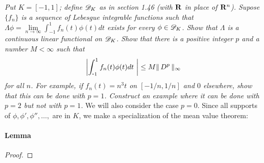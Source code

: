 \textit{
Put $K=[-1,1]$; define ${\mathscr D}_{K}$ as in section 1.46 
(with ${\mathbf R}$ in place of ${\mathbf R}^{n}$). 
Supose $\{f_{n}\}$ is a sequence of Lebesgue integrable functions such that 
%
  $\Lambda\phi 
    = 
  \underset{n \to \infty}{\lim} \int_{\minus 1}^1 f_{n}(t)\phi(t)dt$
%
exists for every $\phi\in{\mathscr D}_{K}$. 
Show that $\Lambda$ is a continuous linear functional on ${\mathscr D}_{K}$. 
Show that there is a positive integer $p$ and a number $M<\infty$ such that 
  \begin{align}
    \left\lvert 
      \int_{\text{\small{-}} 1}^1 f_n (t)\phi (t) dt\
    \right\rvert
    \leq 
    M \| \,D^{p} \, \|_{\infty} 
  \nonumber
  \end{align}
for all $n$.
For example, if $f_{n}(t)=n^{3}t$ on $[\minus 1/n, 1/n]$ and $0$ elsewhere, 
show that this can be done with $p=1$. 
Construct an example where it can be done with $p=2$ but not with $p=1$.}
%
%
\renewcommand{\labelenumi}{(\roman{enumi})}%
%
\newline\newline\noindent
We will also consider the case $p=0$. Since all supports of %
%
  $\phi, \phi', \phi'', \dots, $ are in $K$, %
%
we make a specialization of the mean value theorem: %
%
\paragraph{Lemma}\label{2.3 Lemma}
 
%
\begin{proof}
 
 
 
 
\end{proof}
\renewcommand{\labelenumi}{$(\textit{\alph{enumi}})$}%